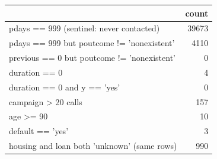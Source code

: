 \begin{tabular}{lr}
\toprule
 & count \\
\midrule
pdays == 999 (sentinel: never contacted) & 39673 \\
pdays == 999 but poutcome != 'nonexistent' & 4110 \\
previous == 0 but poutcome != 'nonexistent' & 0 \\
duration == 0 & 4 \\
duration == 0 and y == 'yes' & 0 \\
campaign > 20 calls & 157 \\
age >= 90 & 10 \\
default == 'yes' & 3 \\
housing and loan both 'unknown' (same rows) & 990 \\
\bottomrule
\end{tabular}
